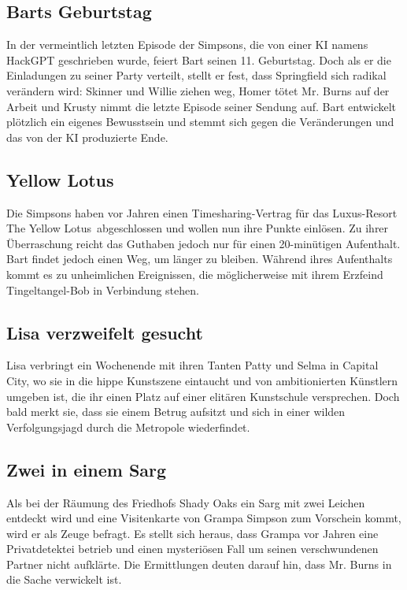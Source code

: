 \subsection{Barts Geburtstag}
In der vermeintlich letzten Episode der Simpsons, die von einer KI namens HackGPT geschrieben wurde, feiert Bart seinen 11. Geburtstag. Doch als er die Einladungen zu seiner Party verteilt, stellt er fest, dass Springfield sich radikal verändern wird: Skinner und Willie ziehen weg, Homer tötet Mr. Burns auf der Arbeit und Krusty nimmt die letzte Episode seiner Sendung auf. Bart entwickelt plötzlich ein eigenes Bewusstsein und stemmt sich gegen die Veränderungen und das von der KI produzierte Ende.

\subsection{Yellow Lotus}
Die Simpsons haben vor Jahren einen Timesharing-Vertrag für das Luxus-Resort \glqq The Yellow Lotus\grqq\ abgeschlossen und wollen nun ihre Punkte einlösen. Zu ihrer Überraschung reicht das Guthaben jedoch nur für einen 20-minütigen Aufenthalt. Bart findet jedoch einen Weg, um länger zu bleiben. Während ihres Aufenthalts kommt es zu unheimlichen Ereignissen, die möglicherweise mit ihrem Erzfeind Tingeltangel-Bob in Verbindung stehen.

\subsection{Lisa verzweifelt gesucht}
Lisa verbringt ein Wochenende mit ihren Tanten Patty und Selma in Capital City, wo sie in die hippe Kunstszene eintaucht und von ambitionierten Künstlern umgeben ist, die ihr einen Platz auf einer elitären Kunstschule versprechen. Doch bald merkt sie, dass sie einem Betrug aufsitzt und sich in einer wilden Verfolgungsjagd durch die Metropole wiederfindet.

\subsection{Zwei in einem Sarg}
Als bei der Räumung des Friedhofs Shady Oaks ein Sarg mit zwei Leichen entdeckt wird und eine Visitenkarte von Grampa Simpson zum Vorschein kommt, wird er als Zeuge befragt. Es stellt sich heraus, dass Grampa vor Jahren eine Privatdetektei betrieb und einen mysteriösen Fall um seinen verschwundenen Partner nicht aufklärte. Die Ermittlungen deuten darauf hin, dass Mr. Burns in die Sache verwickelt ist.

